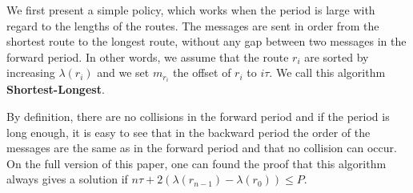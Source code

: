 \documentclass[10pt, conference, letterpaper]{IEEEtran}
\newtheorem{proposition}{Proposition}
\begin{document}
    We first present a simple policy, which works when the period is large with regard to the lengths of the routes.
    The messages are sent in order from the shortest route to the longest route, without any gap between two messages in the forward period.
    In other words, we assume that the route $r_i$ are sorted by increasing $\lambda(r_i)$ and we set $m_{r_i}$ the offset of $r_i$ to $i\tau$. We call this algorithm {\bf Shortest-Longest}.
      
     By definition, there are no collisions in the forward period and if the period is long enough, 
     it is easy to see that in the backward period the order of the messages are the same as in the forward period and that no collision can occur. On the full version of this paper, one can found the proof that this algorithm always gives a solution if  $n\tau + 2(\lambda(r_{n-1}) - \lambda(r_{0})) \leq P$.
      
%      
%       
%       
%
%
       
\end{document}
